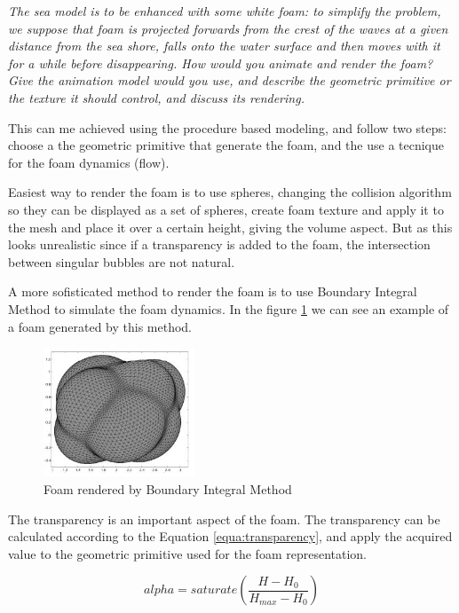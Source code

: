 \documentclass{report}
\begin{document}
\emph{The sea model is to be enhanced with some white foam: to simplify the problem, we
suppose that foam is projected forwards from the crest of the waves at a given distance from
the sea shore, falls onto the water surface and then moves with it for a while before
disappearing. How would you animate and render the foam? Give the animation model would
you use, and describe the geometric primitive or the texture it should control, and discuss its
rendering.}

This can me achieved using the procedure based modeling, and follow two steps: choose a the geometric primitive that generate the foam, and the use a tecnique for the foam dynamics (flow). 

Easiest way to render the foam is to use spheres, changing the collision algorithm so they can be displayed as a set of spheres, create foam texture and apply it to the mesh and place it over a certain height, giving the volume aspect.
But as this looks unrealistic since if a transparency is added to the foam, the intersection between singular bubbles are not natural. 

A more sofisticated method to render the foam is to use Boundary Integral Method to simulate the foam dynamics\cite{bim}. In the figure \ref{fig:dim-foam} we can see an example of a foam generated by this method.

\begin{figure}[H]
\centering
\includegraphics[width=0.4\textwidth]{image/dim01.png}
\caption{Foam rendered by Boundary Integral Method}
\label{fig:dim-foam}
\end{figure}

The transparency is an important aspect of the foam. The transparency can be calculated\cite{nvidia} according to the Equation \ref{equa:transparency}, and apply the acquired value to the geometric primitive used for the foam representation.

\begin{equation}
alpha=saturate(\frac{H-H_0}{H_{max} - H_0})
\label{equa:transparency}
\end{equation}
\end{document}
